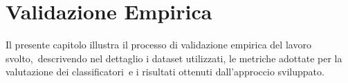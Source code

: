 \chapter{Validazione Empirica}

Il presente capitolo illustra il processo di validazione empirica del lavoro svolto,\
descrivendo nel dettaglio i dataset utilizzati, le metriche adottate per la valutazione dei classificatori\
e i risultati ottenuti dall'approccio sviluppato.




